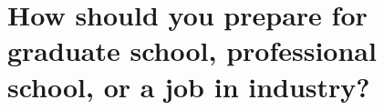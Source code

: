 {
\begin{frame}[plain]
\end{frame}
}
{
\begin{frame}[plain]
\end{frame}
}

\section{How should you prepare for graduate school, professional school, or a
    job in industry?}

